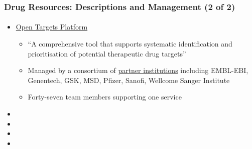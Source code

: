 \documentclass[aspectratio=169,xcolor=dvipsnames]{beamer}
\begin{document}
\begin{frame}
  \frametitle{Drug Resources: Descriptions and Management (2 of 2)}
  \framesubtitle{}
  \begin{itemize}
  \item[]
    \href{https://platform-docs.opentargets.org/getting-started}{Open
      Targets Platform}
    \begin{itemize}
    \item ``A comprehensive tool that supports systematic
      identification and prioritisation of potential therapeutic drug
      targets''
    \item Managed by a consortium of
      \href{https://www.opentargets.org/partners}{partner
        institutions} including EMBL-EBI, Genentech, GSK, MSD, Pfizer,
      Sanofi, Wellcome Sanger Institute
    \item Forty-seven team members supporting one service
    \end{itemize}
  \item[]
  \item[]
  \item[]
  \item[]
  \end{itemize}
\end{frame}
\end{document}
